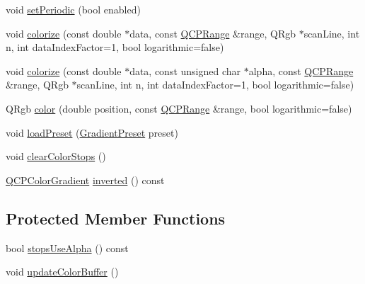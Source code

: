 \begin{DoxyCompactItemize}
\item 
void \hyperlink{class_q_c_p_color_gradient_a39d6448155fc00a219f239220d14bb39}{set\+Periodic} (bool enabled)
\item 
void \hyperlink{class_q_c_p_color_gradient_aaf423ceb943e177b0ed2c48c811d83dc}{colorize} (const double $\ast$data, const \hyperlink{class_q_c_p_range}{Q\+C\+P\+Range} \&range, Q\+Rgb $\ast$scan\+Line, int n, int data\+Index\+Factor=1, bool logarithmic=false)
\item 
void \hyperlink{class_q_c_p_color_gradient_acf0cc7fba83ef21f7b8d5d5258519db3}{colorize} (const double $\ast$data, const unsigned char $\ast$alpha, const \hyperlink{class_q_c_p_range}{Q\+C\+P\+Range} \&range, Q\+Rgb $\ast$scan\+Line, int n, int data\+Index\+Factor=1, bool logarithmic=false)
\item 
Q\+Rgb \hyperlink{class_q_c_p_color_gradient_a0599545c859268b025d2060dea741cea}{color} (double position, const \hyperlink{class_q_c_p_range}{Q\+C\+P\+Range} \&range, bool logarithmic=false)
\item 
void \hyperlink{class_q_c_p_color_gradient_aa0aeec1528241728b9671bf8e60b1622}{load\+Preset} (\hyperlink{class_q_c_p_color_gradient_aed6569828fee337023670272910c9072}{Gradient\+Preset} preset)
\item 
void \hyperlink{class_q_c_p_color_gradient_a939213e85f0d1279519d555c5fcfb6ad}{clear\+Color\+Stops} ()
\item 
\hyperlink{class_q_c_p_color_gradient}{Q\+C\+P\+Color\+Gradient} \hyperlink{class_q_c_p_color_gradient_a9f72f501de429829ec446333316decda}{inverted} () const
\end{DoxyCompactItemize}
\subsection*{Protected Member Functions}
\begin{DoxyCompactItemize}
\item 
bool \hyperlink{class_q_c_p_color_gradient_a137b368ea8829a871974add6e4883c71}{stops\+Use\+Alpha} () const
\item 
void \hyperlink{class_q_c_p_color_gradient_a353f15ab3ab586eebf1f6b58c3e2707b}{update\+Color\+Buffer} ()
\end{DoxyCompactItemize}
